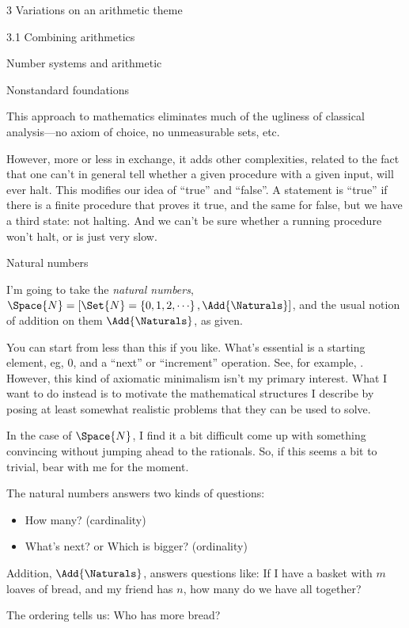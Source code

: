 \documentclass[12pt]{PalisadesLakesBook}
\begin{document}
\begin{plSection}{3 Variations on an arithmetic theme}
\begin{plSection}{3.1 Combining arithmetics}
\begin{plSection}{Number systems and arithmetic}
\begin{plSection}{Nonstandard foundations}
\begin{itemize}
This approach to mathematics eliminates much of the ugliness
of classical analysis---no axiom of choice, no unmeasurable
sets, etc.

However, more or less in exchange, it adds other complexities,
related to the fact that one can't in general tell whether a given
procedure with a given input, will ever halt.
This modifies our idea of ``true'' and ``false''.
A statement is ``true'' if there is a finite procedure that
proves it true, and the same for false,
but we have a third state: not halting. 
And we can't be sure whether a running procedure won't halt,
or is just very slow.

\end{itemize}

\end{plSection}%
\begin{plSection}{Natural numbers}

I'm going to take the \emph{natural numbers},
$\Space{N} =
 [ \Set{N}=\left\{ 0, 1, 2, {\cdots}\right\}, \Add{\Naturals}]$,
and the usual notion of addition on them $\Add{\Naturals}$,
as given.

You can start from less than this if you like.
What's essential is a starting element, eg, $0$,
and a ``next'' or ``increment'' operation. 
See, for example, 
.
However, this kind of axiomatic minimalism 
isn't my primary interest.
What I want to do instead is to motivate the mathematical
structures I describe by posing at least somewhat realistic
problems that they can be used to solve.

In the case of $\Space{N}$, I find it a bit difficult 
come up with something convincing without
jumping ahead to the rationals.
So, if this seems a bit to trivial,
 bear with me for the moment.

The natural numbers answers two kinds of questions:
\begin{itemize}
\item How many? (cardinality)
\item What's next? or Which is bigger? (ordinality)
\end{itemize}

Addition, $\Add{\Naturals}$, answers questions like:
If I have a basket with $m$ loaves of bread,
and my friend has $n$, how many do we have all together?

The ordering tells us: Who has more bread?


\end{plSection}
\end{plSection}
\end{plSection}
\end{plSection}
\end{document}
